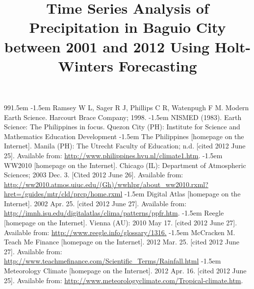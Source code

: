 \documentclass{pshscarc2013}
\title{\textbf{Time Series Analysis of Precipitation in Baguio City between 2001 and 2012 Using Holt-Winters Forecasting}}
\begin{document}
\maketitle %
\makePrelim %
\listoflistings






\renewcommand{\bibname}{Cited References}
\def\bibindent{1.5em}
\begin{thebibliography}{99\kern\bibindent}
\makeatletter
\let\old@biblabel\@biblabel
\def\@biblabel#1{\old@biblabel{#1}\kern\bibindent}
\let\old@bibitem\bibitem
\def\bibitem#1{\old@bibitem{#1}\leavevmode\kern-\bibindent}
\renewcommand\@biblabel[1]{}
\setlength{\parskip}{0pt}
\setlength{\itemsep}{0pt plus 0.3ex}
\makeatother
{} Ramsey W L, Sager R J, Phillips C R, Watenpugh F M. Modern Earth Science. Harcourt Brace Company; 1998.
 NISMED (1983). Earth Science: The Philippines in focus. Quezon City (PH): Institute for Science and Mathematics Education Development
 The Philippines [homepage on the Internet]. Manila (PH): The Utrecht Faculty of Education; n.d. [cited 2012 June 25]. Available from: \url{http://www.philippines.hvu.nl/climate1.htm}.
 WW2010 [homepage on the Internet]. Chicago (IL): Department of Atmospheric Sciences; 2003 Dec. 3. [Cited 2012 June 26]. Available from: \url{http://ww2010.atmos.uiuc.edu/(Gh)/wwhlpr/about_ww2010.rxml?hret=/guides/mtr/cld/prcp/home.rxml}
 Digital Atlas [homepage on the Internet]. 2002 Apr. 25. [cited 2012 June 27]. Available from: \url{http://imnh.isu.edu/digitalatlas/clima/patterns/ppfr.htm}.
 Reegle [homepage on the Internet]. Vienna (AU): 2010 May 17. [cited 2012 June 27]. Available from: \url{http://www.reegle.info/glossary/1316.}
 McCracken M. Teach Me Finance [homepage on the Internet]. 2012 Mar. 25. [cited 2012 June 27]. Available from: \url{ http://www.teachmefinance.com/Scientific_Terms/Rainfall.html}
 Meteorology Climate [homepage on the Internet]. 2012 Apr. 16. [cited 2012 June 25]. Available from: \url{http://www.meteorologyclimate.com/Tropical-climate.htm}.

\end{thebibliography}
\end{document}

